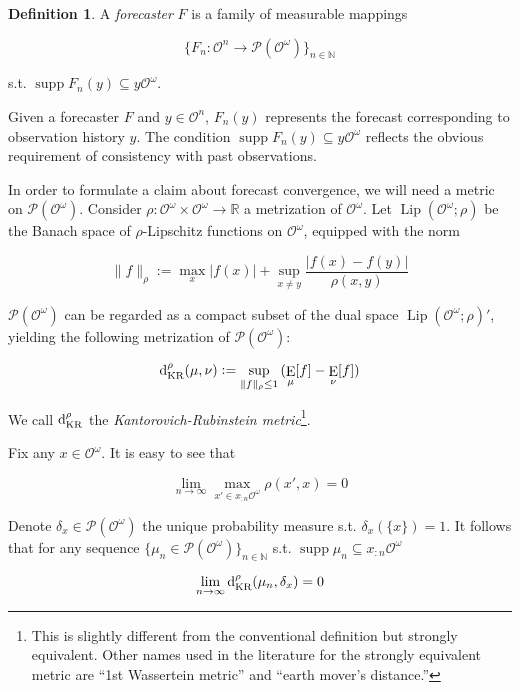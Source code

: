 \documentclass[11pt]{article}
\theoremstyle{definition}
\newtheorem{definition}{Definition}%
\theoremstyle{plain}
\newcommand{\Nats}{\mathbb{N}}
\newcommand{\Reals}{\mathbb{R}}
\newcommand{\A}[1]{\lvert #1 \rvert}
\newcommand{\N}[1]{\lVert #1 \rVert}
\newcommand{\Sq}[2]{\{#1\}_{#2 \in \Nats}}
\newcommand{\Sqn}[1]{\Sq{#1}{n}}
\DeclareMathOperator{\E}{E}
\newcommand{\PM}{\mathcal{P}}
\newcommand{\Lp}{{\operatorname{Lip}}}
\DeclareMathOperator{\Sp}{supp}
\newcommand{\DKR}{\operatorname{d}_{\textnormal{KR}}}
\newcommand{\Ob}{\mathcal{O}}
\newcommand{\OO}{\Ob^\omega}
\newcommand{\PMO}{\PM(\OO)}
\begin{document}
\begin{definition}

A \emph{forecaster} $F$ is a family of measurable mappings

\[\Sqn{F_n: \Ob^n \rightarrow \PMO}\]

s.t. $\Sp {F_n(y)} \subseteq y\OO$.

\end{definition}

Given a forecaster $F$ and $y \in \Ob^n$, $F_n(y)$ represents the forecast corresponding to observation history $y$. The condition $\Sp {F_n(y)} \subseteq y\OO$ reflects the obvious requirement of consistency with past observations.

In order to formulate a claim about forecast convergence, we will need a metric on $\PMO$. Consider $\rho: \OO \times \OO \rightarrow \Reals$ a metrization of $\OO$. Let $\Lp(\OO;\rho)$ be the Banach space of $\rho$-Lipschitz functions on $\OO$, equipped with the norm

\begin{equation}
\N{f}_\rho:=\max_{x}{\A{f(x)}} + \sup_{x \ne y} \frac{\A{f(x)-f(y)}}{\rho(x,y)}
\end{equation}

$\PMO$ can be regarded as a compact subset of the dual space $\Lp(\OO;\rho)'$, yielding the following metrization of $\PMO$:

\begin{equation}
\DKR^\rho(\mu,\nu):=\sup_{\N{f}_\rho \leq 1}{(\E_\mu[f] - \E_\nu[f])}
\end{equation}

We call $\DKR^\rho$ the \emph{Kantorovich-Rubinstein metric}\footnote{This is slightly different from the conventional definition but strongly equivalent. Other names used in the literature for the strongly equivalent metric are \enquote{1st Wassertein metric} and \enquote{earth mover's distance.}}.

Fix any $x \in \OO$. It is easy to see that

\begin{equation}
\lim_{n \rightarrow \infty} \max_{x' \in x_{:n}\OO} \rho(x', x) = 0
\end{equation}

Denote $\delta_x \in \PMO$ the unique probability measure s.t. $\delta_x(\{x\})=1$. It follows that for any sequence $\Sqn{\mu_n \in \PMO}$ s.t. $\Sp{\mu_n} \subseteq x_{:n}\OO$

\begin{equation}
\lim_{n \rightarrow \infty} \DKR^\rho(\mu_n, \delta_x) = 0
\end{equation}
\end{document}

